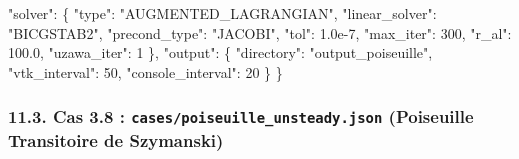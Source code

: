 \documentclass[
  french,
]{article}
\newenvironment{Shaded}{}{}
\newcommand{\DataTypeTok}[1]{\textcolor[rgb]{0.56,0.13,0.00}{#1}}
\newcommand{\DecValTok}[1]{\textcolor[rgb]{0.25,0.63,0.44}{#1}}
\newcommand{\FloatTok}[1]{\textcolor[rgb]{0.25,0.63,0.44}{#1}}
\newcommand{\FunctionTok}[1]{\textcolor[rgb]{0.02,0.16,0.49}{#1}}
\newcommand{\StringTok}[1]{\textcolor[rgb]{0.25,0.44,0.63}{#1}}
\begin{document}
\begin{Shaded}
\begin{Highlighting}[]
  \DataTypeTok{"solver"}\FunctionTok{:} \FunctionTok{\{}
    \DataTypeTok{"type"}\FunctionTok{:} \StringTok{"AUGMENTED\_LAGRANGIAN"}\FunctionTok{,}
    \DataTypeTok{"linear\_solver"}\FunctionTok{:} \StringTok{"BICGSTAB2"}\FunctionTok{,}
    \DataTypeTok{"precond\_type"}\FunctionTok{:} \StringTok{"JACOBI"}\FunctionTok{,}
    \DataTypeTok{"tol"}\FunctionTok{:} \FloatTok{1.0e{-}7}\FunctionTok{,} \DataTypeTok{"max\_iter"}\FunctionTok{:} \DecValTok{300}\FunctionTok{,} \DataTypeTok{"r\_al"}\FunctionTok{:} \FloatTok{100.0}\FunctionTok{,} \DataTypeTok{"uzawa\_iter"}\FunctionTok{:} \DecValTok{1}
  \FunctionTok{\},}
  \DataTypeTok{"output"}\FunctionTok{:} \FunctionTok{\{} \DataTypeTok{"directory"}\FunctionTok{:} \StringTok{"output\_poiseuille"}\FunctionTok{,} \DataTypeTok{"vtk\_interval"}\FunctionTok{:} \DecValTok{50}\FunctionTok{,} \DataTypeTok{"console\_interval"}\FunctionTok{:} \DecValTok{20} \FunctionTok{\}}
\FunctionTok{\}}
\end{Highlighting}
\end{Shaded}

\subsubsection{\texorpdfstring{11.3. Cas 3.8 :
\texttt{cases/poiseuille\_unsteady.json} (Poiseuille Transitoire de
Szymanski)}{11.3. Cas 3.8 : cases/poiseuille\_unsteady.json (Poiseuille Transitoire de Szymanski)}}\label{cas-3.8-casespoiseuille_unsteady.json-poiseuille-transitoire-de-szymanski}
\end{document}
